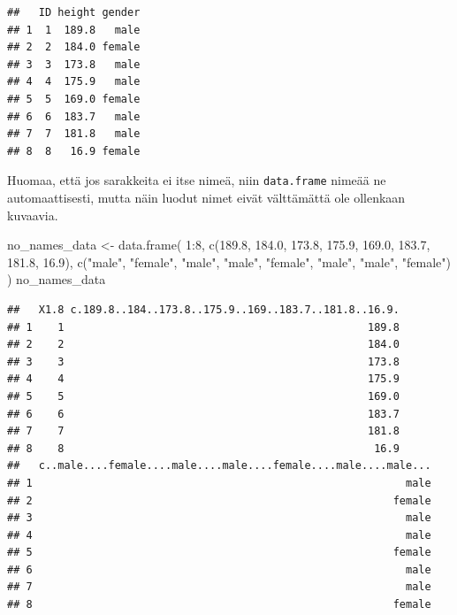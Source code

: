 \documentclass[
]{book}
\newenvironment{Shaded}{\begin{snugshade}}{\end{snugshade}}
\newcommand{\DecValTok}[1]{\textcolor[rgb]{0.00,0.00,0.81}{#1}}
\newcommand{\FloatTok}[1]{\textcolor[rgb]{0.00,0.00,0.81}{#1}}
\newcommand{\FunctionTok}[1]{\textcolor[rgb]{0.00,0.00,0.00}{#1}}
\newcommand{\NormalTok}[1]{#1}
\newcommand{\OtherTok}[1]{\textcolor[rgb]{0.56,0.35,0.01}{#1}}
\newcommand{\SpecialCharTok}[1]{\textcolor[rgb]{0.00,0.00,0.00}{#1}}
\newcommand{\StringTok}[1]{\textcolor[rgb]{0.31,0.60,0.02}{#1}}
\begin{document}
\begin{verbatim}
##   ID height gender
## 1  1  189.8   male
## 2  2  184.0 female
## 3  3  173.8   male
## 4  4  175.9   male
## 5  5  169.0 female
## 6  6  183.7   male
## 7  7  181.8   male
## 8  8   16.9 female
\end{verbatim}

Huomaa, että jos sarakkeita ei itse nimeä, niin \texttt{data.frame} nimeää ne automaattisesti, mutta näin luodut nimet eivät välttämättä ole ollenkaan kuvaavia.

\begin{Shaded}
\begin{Highlighting}[]
\NormalTok{no\_names\_data }\OtherTok{\textless{}{-}} \FunctionTok{data.frame}\NormalTok{(}
    \DecValTok{1}\SpecialCharTok{:}\DecValTok{8}\NormalTok{,}
    \FunctionTok{c}\NormalTok{(}\FloatTok{189.8}\NormalTok{, }\FloatTok{184.0}\NormalTok{, }\FloatTok{173.8}\NormalTok{, }\FloatTok{175.9}\NormalTok{, }\FloatTok{169.0}\NormalTok{, }\FloatTok{183.7}\NormalTok{, }\FloatTok{181.8}\NormalTok{, }\FloatTok{16.9}\NormalTok{),}
    \FunctionTok{c}\NormalTok{(}\StringTok{"male"}\NormalTok{, }\StringTok{"female"}\NormalTok{, }\StringTok{"male"}\NormalTok{, }\StringTok{"male"}\NormalTok{, }\StringTok{"female"}\NormalTok{, }\StringTok{"male"}\NormalTok{, }\StringTok{"male"}\NormalTok{, }\StringTok{"female"}\NormalTok{)}
\NormalTok{)}
\NormalTok{no\_names\_data}
\end{Highlighting}
\end{Shaded}

\begin{verbatim}
##   X1.8 c.189.8..184..173.8..175.9..169..183.7..181.8..16.9.
## 1    1                                                189.8
## 2    2                                                184.0
## 3    3                                                173.8
## 4    4                                                175.9
## 5    5                                                169.0
## 6    6                                                183.7
## 7    7                                                181.8
## 8    8                                                 16.9
##   c..male....female....male....male....female....male....male...
## 1                                                           male
## 2                                                         female
## 3                                                           male
## 4                                                           male
## 5                                                         female
## 6                                                           male
## 7                                                           male
## 8                                                         female
\end{verbatim}
\end{document}
